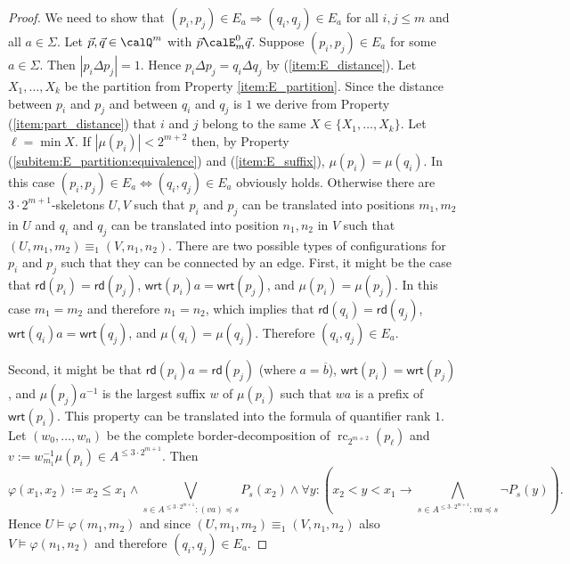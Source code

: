 \documentclass[a4paper,numberwithinsect,USenglish]{lipics-v2018}
\theoremstyle{plain}
\theoremstyle{remark}
\DeclareMathOperator{\cpr}{rc}
\newcommand{\ov}[1]{\overline{#1}}
\newcommand{\rd}[1]{\mathsf{rd}(#1)}
\newcommand{\wrt}[1]{\mathsf{wrt}(#1)}
\newcommand{\Qx}{\calQ}
\newcommand{\mddl}[1]{\mu(#1)}
\renewcommand{\phi}{\varphi}
\renewcommand{\Sigma}{\varSigma}
\begin{document}
\begin{proof}
	We need to show that $(p_i,p_j)\in E_a \Rightarrow (q_i,q_j)\in E_a$  for all $i,j\leq m$ and all $a\in \Sigma$.
	Let $\vec{p}, \vec{q} \in \Qx^m$ with $\vec{p} \calE^0_m \vec{q}$. Suppose  $(p_i,p_j) \in E_a$ for some $a\in\Sigma$. Then $|p_i\Delta p_j| = 1$. Hence $p_i\Delta p_j = q_i\Delta q_j$ by (\ref{item:E_distance}). 
	Let $X_1,\ldots, X_k$ be the partition from Property \ref{item:E_partition}. Since the distance between $p_i$ and $p_j$ and between $q_i$ and $q_j$ is $1$ we derive from Property (\ref{item:part_distance}) that $i$ and $j$ belong to the same 
	$X\in\{X_1,\ldots, X_k\}$. Let $\ell = \min X$.
	If $|\mu(p_i)| < 2^{m  +2}$ then, by Property (\ref{subitem:E_partition:equivalence}) and (\ref{item:E_suffix}), $\mu(p_i) = \mu(q_i)$. In this case $(p_i, p_j) \in E_a \Leftrightarrow (q_i,q_j) \in E_a$  obviously holds.
	Otherwise there are $3\cdot2^{m + 1}$-skeletons $U,V$ such that 
	$p_i$ and $p_j$ can be translated into positions $m_1, m_2$ in $U$ and $q_i$ and $q_j$ can be translated into position $n_1,n_2$ in $V$ such that $(U,m_1,m_2) \equiv_1 (V,n_1,n_2)$. 
	There are two possible types of configurations for $p_i$ and $p_j$ such that they can be connected by an edge. First, it might be the case  that $\rd{p_i} = \rd{p_j}$,
	$\wrt{p_i}a = \wrt{p_j}$, and $\mddl{p_i} = \mddl{p_j}$. In this case $m_1=m_2$ and therefore $n_1=n_2$, which implies that $\rd{q_i} = \rd{q_j}$,
	$\wrt{q_i}a = \wrt{q_j}$, and $\mddl{q_i} = \mddl{q_j}$. Therefore $(q_i,q_j) \in E_a$.
	
	Second, it might be that $\rd{p_i}a = \rd{p_j}$ (where $a=\ov{b}$),
	$\wrt{p_i} = \wrt{p_j}$, and $\mddl{p_j}a^{-1}$ is the largest suffix $w$ of $\mddl{p_i}$ such that $wa$ is a prefix of $\wrt{p_i}$.  This property can be translated into the formula of quantifier rank $1$. Let $(w_0,\ldots, w_n)$ be the complete border-decomposition of $\cpr_{2^{m+2}}(p_\ell)$ and $v:= w_{m_1}^{-1}\mddl{p_i} \in A^{\leq 3\cdot 2^{m+1}}$. Then
	\[\phi(x_1, x_2) \coloneq x_2 \leq x_1 \land \bigvee_{s\in A^{\leq 3\cdot 2^{m+1}} : (va)\preceq s} P_s(x_2) \land  \forall y: \left(x_2 < y < x_1 \to \bigwedge_{s\in A^{\leq 3\cdot 2^{m+1}} : va\preceq s} \lnot P_s(y)\right) . \]
	Hence $U \models \phi(m_1,m_2)$  and since $(U,m_1,m_2) \equiv_1 (V, n_1,n_2)$ also $V \models \phi(n_1, n_2)$ and therefore $(q_i,q_j)\in E_a$.
\end{proof}
\end{document}

